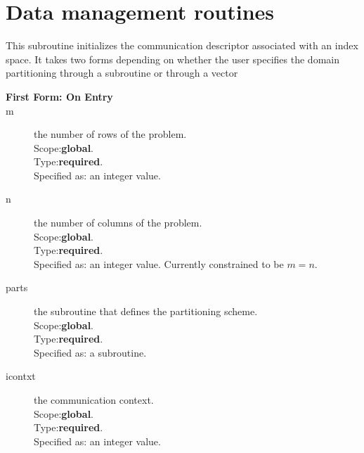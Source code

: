 \section{Data management routines}
\label{sec:toolsrout}


%
%


This subroutine initializes the communication descriptor associated
with an index space. It takes two forms depending on whether the user
specifies the domain partitioning through a subroutine or through a vector
\begin{description}
\item[\bf  First Form: On Entry ]
\item[m] the number of rows of the problem.\\
Scope:{\bf global}.\\
Type:{\bf required}.\\
Specified as: an integer value.
\item[n] the number of columns of the problem.\\
Scope:{\bf global}.\\
Type:{\bf required}.\\
Specified as: an integer value. Currently constrained to be  $m=n$.
\item[parts] the subroutine that defines the partitioning scheme.\\
Scope:{\bf global}.\\
Type:{\bf required}.\\
Specified as: a subroutine. 
\item[icontxt] the communication context.\\
Scope:{\bf global}.\\
Type:{\bf required}.\\
Specified as: an integer value.
\end{description}
